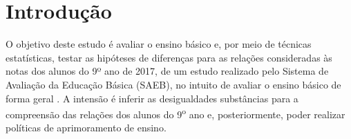 
\chapter*[Introdução]{Introdução}

O objetivo deste estudo é avaliar o ensino básico e, por meio de técnicas estatísticas,
testar as hipóteses de diferenças para as relações consideradas às notas dos alunos do 9º ano de 2017,
 de um estudo realizado pelo Sistema de Avaliação da Educação Básica (SAEB), no intuito de avaliar
 o ensino básico de forma geral \cite{Saeb2017a)}. A intensão é inferir as desigualdades substâncias
 para a compreensão das relações dos alunos do 9\textsuperscript{o} ano e, posteriormente,
poder realizar políticas de aprimoramento de ensino.
